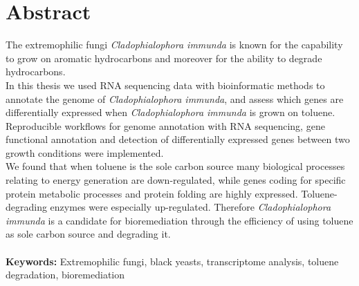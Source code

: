 \documentclass[12pt, a4paper]{report}
\begin{document}
\newpage
{}
\section*{Abstract}
The extremophilic fungi \textit{Cladophialophora immunda} is known for the capability to grow on aromatic hydrocarbons and moreover for the
ability to degrade hydrocarbons.\\ In this thesis we used RNA
sequencing data with bioinformatic methods to annotate the genome of \textit{Cladophialophora immunda}, and assess which genes are differentially expressed when \textit{Cladophialophora immunda} is grown on toluene. 
Reproducible workflows for genome annotation with RNA sequencing, gene
functional annotation and detection of differentially expressed genes
between two growth conditions were implemented.\\ 
We found that when toluene is the sole carbon source many biological
processes relating to energy generation are down-regulated, while
genes coding for specific protein metabolic processes and protein
folding are highly expressed. Toluene-degrading enzymes
were especially up-regulated. Therefore \textit{Cladophialophora
  immunda} is a candidate for bioremediation through the efficiency of
using toluene as sole carbon source and degrading it. \\ 
\ \\ \textbf{Keywords:} Extremophilic fungi, black
yeasts, transcriptome analysis, toluene degradation, bioremediation 
\newpage
\end{document}
